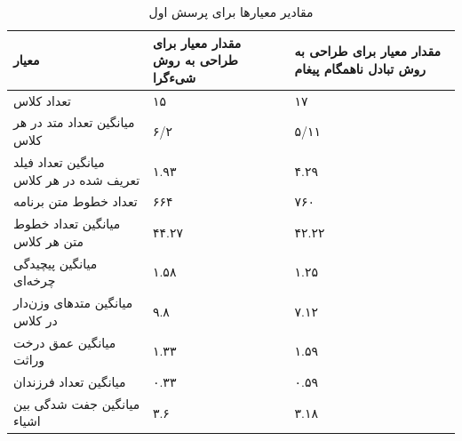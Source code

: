 \begin{table}
\begin{center}
\begin{tabular}{|p{7cm}|p{4cm}|p{4cm}|}
	\hline
\textbf{معیار} & \textbf{مقدار معیار برای طراحی به روش شیءگرا} & \textbf{مقدار معیار برای طراحی به روش تبادل ناهمگام پیغام} 
\\ 
	\hline
	تعداد کلاس
	 &
\centering	 ۱۵
	 &
\centering	 ۱۷
\\
	\hline
	میانگین تعداد متد در هر کلاس
	 &
\centering	 ۶/۲
	 &
\centering	 ۵/۱۱
\\
	\hline
	میانگین تعداد فیلد تعریف شده در هر کلاس
	 &
\centering	 ۱.۹۳
	 &
\centering	 ۴.۲۹
\\
	\hline

	تعداد خطوط متن برنامه
	 &
\centering	 ۶۶۴
	 &
\centering	 ۷۶۰
\\
	\hline
	
		میانگین تعداد خطوط متن هر کلاس
	 &
\centering	 ۴۴.۲۷
	 &
\centering	 ۴۲.۲۲
\\
	\hline
	
		میانگین پیچیدگی چرخه‌ای
	 &
\centering	 ۱.۵۸
	 &
\centering	 ۱.۲۵
\\
	\hline
	
		میانگین متدهای وزن‌دار در کلاس
	 &
\centering	 ۹.۸
	 &
\centering	 ۷.۱۲
\\
	\hline
	
		میانگین عمق درخت وراثت
	 &
\centering	 ۱.۳۳
	 &
\centering	 ۱.۵۹
\\
	\hline
	
		میانگین تعداد فرزندان
	 &
\centering	 ۰.۳۳
	 &
\centering	 ۰.۵۹
\\
	\hline
	
			میانگین جفت شدگی بین اشیاء
	 &
\centering	 ۳.۶
	 &
\centering	 ۳.۱۸
\\
	\hline
\end{tabular}
\caption{\label{table:mod_result_1} مقادیر معیارها برای پرسش اول}
\end{center}
\end{table}










